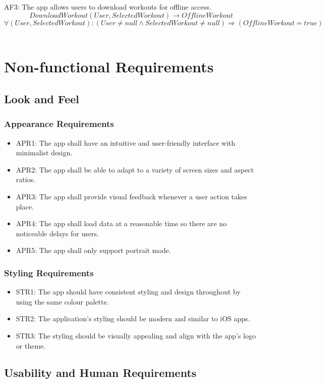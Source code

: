 \documentclass[12pt]{article}
\begin{document}
AF3: The app allows users to download workouts for offline access.
\[DownloadWorkout(User, SelectedWorkout) \rightarrow OfflineWorkout \]
\[ \forall (User, SelectedWorkout): (User \neq null \land SelectedWorkout \neq null) \Rightarrow (OfflineWorkout = true) \]\\

\section{Non-functional Requirements}

\subsection{Look and Feel}

\subsubsection{Appearance Requirements}
\begin{itemize}
\item APR1: The app shall have an intuitive and user-friendly interface with minimalist design.
\item APR2: The app shall be able to adapt to a variety of screen sizes and aspect ratios.
\item APR3: The app shall provide visual feedback whenever a user action takes place.
\item APR4: The app shall load data at a reasonable time so there are no noticeable delays for users.
\item APR5: The app shall only support portrait mode.
\end{itemize}

\subsubsection{Styling Requirements}
\begin{itemize}
\item STR1: The app should have consistent styling and design throughout by using the same colour palette.
\item STR2: The application’s styling should be modern and similar to iOS apps.
\item STR3: The styling should be visually appealing and align with the app’s logo or theme.
\end{itemize}

\subsection{Usability and Human Requirements}
\end{document}
